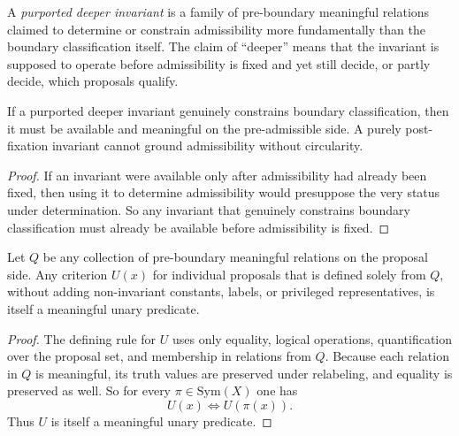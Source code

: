 \begin{definition}
A \emph{purported deeper invariant} is a family of pre-boundary meaningful relations claimed to determine or constrain admissibility more fundamentally than the boundary classification itself. The claim of ``deeper'' means that the invariant is supposed to operate before admissibility is fixed and yet still decide, or partly decide, which proposals qualify.
\end{definition}

\begin{lemma}
If a purported deeper invariant genuinely constrains boundary classification, then it must be available and meaningful on the pre-admissible side. A purely post-fixation invariant cannot ground admissibility without circularity.
\end{lemma}

\begin{proof}
If an invariant were available only after admissibility had already been fixed, then using it to determine admissibility would presuppose the very status under determination. So any invariant that genuinely constrains boundary classification must already be available before admissibility is fixed.\cite{MaleyNecessity}
\end{proof}

\begin{lemma}
Let $Q$ be any collection of pre-boundary meaningful relations on the proposal side. Any criterion $U(x)$ for individual proposals that is defined solely from $Q$, without adding non-invariant constants, labels, or privileged representatives, is itself a meaningful unary predicate.
\end{lemma}

\begin{proof}
The defining rule for $U$ uses only equality, logical operations, quantification over the proposal set, and membership in relations from $Q$. Because each relation in $Q$ is meaningful, its truth values are preserved under relabeling, and equality is preserved as well. So for every $\pi\in \mathrm{Sym}(X)$ one has
\[
  U(x) \iff U(\pi(x)).
\]
Thus $U$ is itself a meaningful unary predicate.\cite{MaleyNecessity}
\end{proof}

